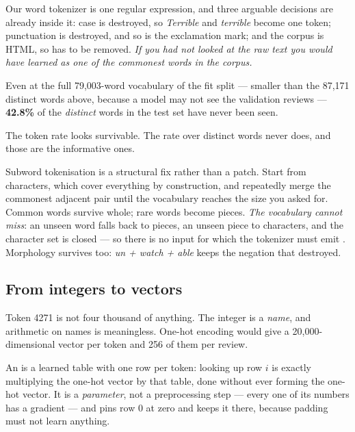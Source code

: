 \documentclass[11pt,a4paper]{article}
\begin{document}
Our word tokenizer is one regular expression, and three arguable decisions are
already inside it: case is destroyed, so \emph{Terrible} and \emph{terrible}
become one token; punctuation is destroyed, and so is the exclamation mark; and
the corpus is HTML, so  has to be removed. \emph{If you had not
looked at the raw text you would have learned  as one of the
commonest words in the corpus.}

\begin{failbox}[title={Failure condition --- what a word vocabulary costs}]
Even at the full 79{,}003-word vocabulary of the fit split --- smaller than the
87{,}171 distinct words above, because a model may not see the validation
reviews --- \textbf{42.8\%} of the \emph{distinct} words in the test set have
never been seen.

The token rate looks survivable. The rate over distinct words never does, and
those are the informative ones.
\end{failbox}

Subword tokenisation is a structural fix rather than a patch. Start from
characters, which cover everything by construction, and repeatedly merge the
commonest adjacent pair until the vocabulary reaches the size you asked for.
Common words survive whole; rare words become pieces. \emph{The vocabulary
cannot miss}: an unseen word falls back to pieces, an unseen piece to
characters, and the character set is closed --- so there is no input for which
the tokenizer must emit \code{[UNK]}. Morphology survives too:
\emph{un + watch + able} keeps the negation that \code{[UNK]} destroyed.

\subsection{From integers to vectors}

Token 4271 is not four thousand of anything. The integer is a \emph{name}, and
arithmetic on names is meaningless. One-hot encoding would give a
20{,}000-dimensional vector per token and 256 of them per review.

An  is a learned table with one row per token: looking up row
$i$ is exactly multiplying the one-hot vector by that table, done without ever
forming the one-hot vector. It is a \emph{parameter}, not a preprocessing step
--- every one of its numbers has a gradient --- and  pins
row 0 at zero and keeps it there, because padding must not learn anything.
\end{document}
